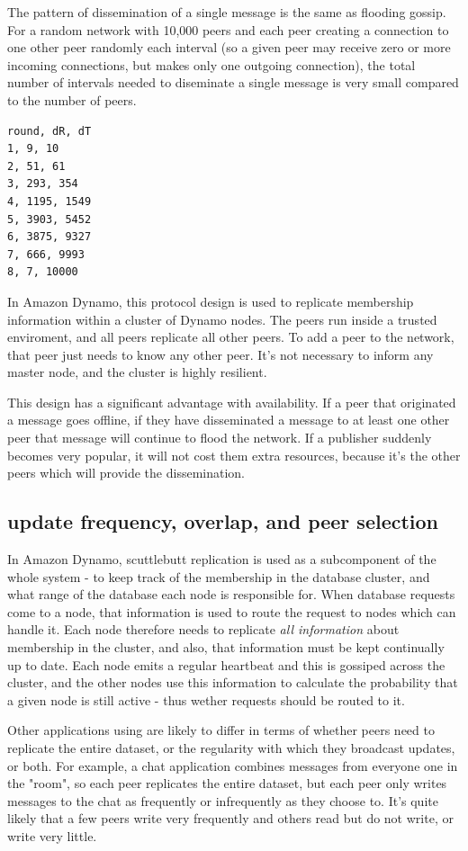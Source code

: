 \documentclass[sigconf]{acmart}
\begin{document}
The pattern of dissemination of a single message is the same as
flooding gossip.  For a random network with 10,000 peers and each peer
creating a connection to one other peer randomly each interval (so a
given peer may receive zero or more incoming connections, but makes
only one outgoing connection), the total number of intervals needed to
diseminate a single message is very small compared to the number of
peers.

\begin{verbatim}
round, dR, dT
1, 9, 10
2, 51, 61
3, 293, 354
4, 1195, 1549
5, 3903, 5452
6, 3875, 9327
7, 666, 9993
8, 7, 10000
\end{verbatim}

In Amazon Dynamo, this protocol design is used to replicate membership
information within a cluster of Dynamo nodes.  The peers run inside a
trusted enviroment, and all peers replicate all other peers. To add a
peer to the network, that peer just needs to know any other peer. It's
not necessary to inform any master node, and the cluster is highly
resilient.

This design has a significant advantage with availability.  If a peer
that originated a message goes offline, if they have disseminated a
message to at least one other peer that message will continue to flood
the network. If a publisher suddenly becomes very popular, it will not
cost them extra resources, because it's the other peers which will
provide the dissemination.

\subsection{update frequency, overlap, and peer selection}

In Amazon Dynamo, scuttlebutt replication is used as a subcomponent of
the whole system - to keep track of the membership in the database
cluster, and what range of the database each node is responsible
for. When database requests come to a node, that information is used
to route the request to nodes which can handle it. Each node therefore
needs to replicate {\em all information} about membership in the
cluster, and also, that information must be kept continually up to
date. Each node emits a regular heartbeat and this is gossiped across
the cluster, and the other nodes use this information to calculate the
probability that a given node is still active - thus wether requests
should be routed to it.

Other applications using are likely to differ in terms of whether
peers need to replicate the entire dataset, or the regularity with
which they broadcast updates, or both. For example, a chat application
combines messages from everyone one in the "room", so each peer
replicates the entire dataset, but each peer only writes messages to
the chat as frequently or infrequently as they choose to. It's quite
likely that a few peers write very frequently and others read but do
not write, or write very little.
\end{document}
